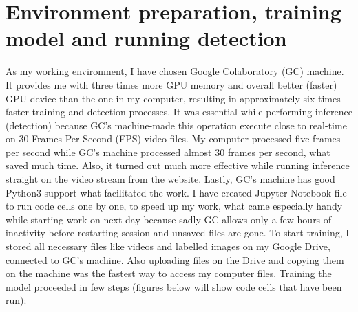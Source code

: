\section{Environment preparation, training model and running detection}
\label{sec:env}
As my working environment, I have chosen Google Colaboratory (GC) machine. It provides me with three times more GPU memory and overall better (faster) GPU device than the one in my computer, resulting in approximately six times faster training and detection processes. It was essential while performing inference (detection) because GC's machine-made this operation execute close to real-time on 30 Frames Per Second (FPS) video files. My computer-processed five frames per second while GC's machine processed almost 30 frames per second, what saved much time. Also, it turned out much more effective while running inference straight on the video stream from the website. Lastly, GC's machine has good Python3 support what facilitated the work. I have created Jupyter Notebook file to run code cells one by one, to speed up my work, what came especially handy while starting work on next day because sadly GC allows only a few hours of inactivity before restarting session and unsaved files are gone. To start training, I stored all necessary files like videos and labelled images on my Google Drive, connected to GC's machine. Also uploading files on the Drive and copying them on the machine was the fastest way to access my computer files. Training the model proceeded in few steps (figures below will show code cells that have been run):
